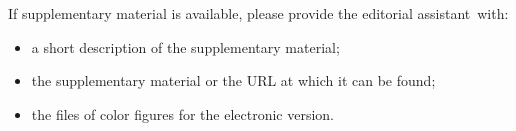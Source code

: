 \documentclass[runningheads]{comsis2}
\begin{document}
If supplementary material is available, please provide the editorial
assistant~with:
\begin{itemize}
  \item a short description of the supplementary material;
  \item the supplementary material or the URL at which it can be found;
  \item the files of color figures for the electronic version.
\end{itemize}

\nocite{Temporal97TDS,CS95,Ontology02}



\end{document}
